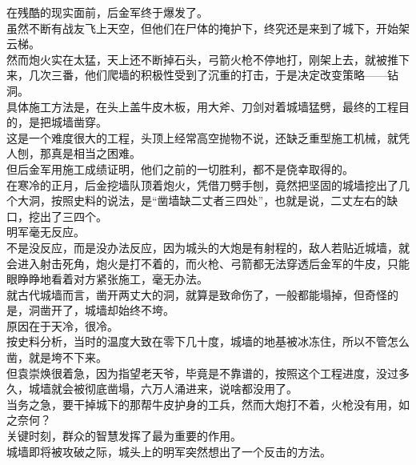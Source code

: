 \begin{multicols}{\theparacolNo}
在残酷的现实面前，后金军终于爆发了。\\

虽然不断有战友飞上天空，但他们在尸体的掩护下，终究还是来到了城下，开始架云梯。\\

然而炮火实在太猛，天上还不断掉石头，弓箭火枪不停地打，刚架上去，就被推下来，几次三番，他们爬墙的积极性受到了沉重的打击，于是决定改变策略——钻洞。\\

具体施工方法是，在头上盖牛皮木板，用大斧、刀剑对着城墙猛劈，最终的工程目的，是把城墙凿穿。\\

这是一个难度很大的工程，头顶上经常高空抛物不说，还缺乏重型施工机械，就凭人刨，那真是相当之困难。\\

但后金军用施工成绩证明，他们之前的一切胜利，都不是侥幸取得的。\\

在寒冷的正月，后金挖墙队顶着炮火，凭借刀劈手刨，竟然把坚固的城墙挖出了几个大洞，按照史料的说法，是“凿墙缺二丈者三四处”，也就是说，二丈左右的缺口，挖出了三四个。\\

明军毫无反应。\\

不是没反应，而是没办法反应，因为城头的大炮是有射程的，敌人若贴近城墙，就会进入射击死角，炮火是打不着的，而火枪、弓箭都无法穿透后金军的牛皮，只能眼睁睁地看着对方紧张施工，毫无办法。\\

就古代城墙而言，凿开两丈大的洞，就算是致命伤了，一般都能塌掉，但奇怪的是，洞凿开了，城墙却始终不垮。\\

原因在于天冷，很冷。\\

按史料分析，当时的温度大致在零下几十度，城墙的地基被冰冻住，所以不管怎么凿，就是垮不下来。\\

但袁崇焕很着急，因为指望老天爷，毕竟是不靠谱的，按照这个工程进度，没过多久，城墙就会被彻底凿塌，六万人涌进来，说啥都没用了。\\

当务之急，要干掉城下的那帮牛皮护身的工兵，然而大炮打不着，火枪没有用，如之奈何？\\

关键时刻，群众的智慧发挥了最为重要的作用。\\

城墙即将被攻破之际，城头上的明军突然想出了一个反击的方法。\\


\end{multicols}
